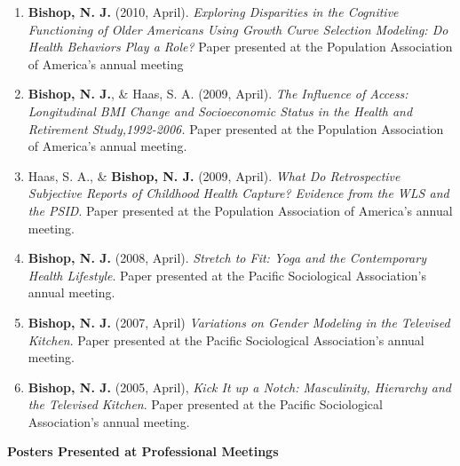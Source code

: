 \documentclass[
]{article}
\begin{document}
\begin{enumerate}
{  Limitations among the Oldest Old}. Paper Presented at the Population
  Association of America's annual meeting.
\item
  \textbf{Bishop, N. J.} (2010, April). \emph{Exploring Disparities in
  the Cognitive Functioning of Older Americans Using Growth Curve
  Selection Modeling: Do Health Behaviors Play a Role?} Paper presented
  at the Population Association of America's annual meeting
\item
  \textbf{Bishop, N. J.}, \& Haas, S. A. (2009, April). \emph{The
  Influence of Access: Longitudinal BMI Change and Socioeconomic Status
  in the Health and Retirement Study,1992-2006.} Paper presented at the
  Population Association of America's annual meeting.
\item
  Haas, S. A., \& \textbf{Bishop, N. J.} (2009, April). \emph{What Do
  Retrospective Subjective Reports of Childhood Health Capture? Evidence
  from the WLS and the PSID}. Paper presented at the Population
  Association of America's annual meeting.
\item
  \textbf{Bishop, N. J.} (2008, April). \emph{Stretch to Fit: Yoga and
  the Contemporary Health Lifestyle}. Paper presented at the Pacific
  Sociological Association's annual meeting.
\item
  \textbf{Bishop, N. J.} (2007, April) \emph{Variations on Gender
  Modeling in the Televised Kitchen}. Paper presented at the Pacific
  Sociological Association's annual meeting.
\item
  \textbf{Bishop, N. J.} (2005, April), \emph{Kick It up a Notch:
  Masculinity, Hierarchy and the Televised Kitchen}. Paper presented at
  the Pacific Sociological Association's annual meeting.
\end{enumerate}

\textbf{Posters Presented at Professional Meetings}
\end{document}
